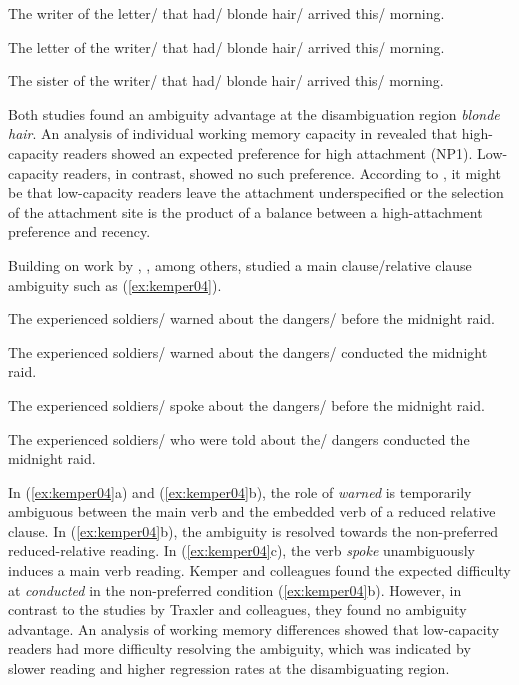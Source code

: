 \documentclass{cambridge7A}\usepackage[]{graphicx}\usepackage[]{color}
\begin{document}
\begin{exe}
\ex\label{ex:traxler07}
\begin{xlist}
\item The writer of the letter/ that had/ blonde hair/ arrived this/ morning.
\item The letter of the writer/ that had/ blonde hair/ arrived this/ morning.
\item The sister of the writer/ that had/ blonde hair/ arrived this/ morning.
\end{xlist}
\end{exe}

Both studies found an ambiguity advantage at the disambiguation region \textit{blonde hair}. An analysis of individual working memory capacity in \cite{Traxler2007} revealed that  high-capacity readers showed an expected preference for high attachment (NP1).  
Low-capacity readers, in contrast, showed no such preference. According to \cite{Traxler2007}, it might be that low-capacity readers leave the attachment underspecified or the selection of the attachment site is the product of a balance between a high-attachment preference and recency.

Building on work by \cite{JustCarpenter1992}, \cite{macdonald1992working}, among others, 
\cite{KemperCrowKemtes2004} studied a main clause/relative clause ambiguity such as (\ref{ex:kemper04}). 

\begin{exe}
\ex\label{ex:kemper04}
\begin{xlist}
\item The experienced soldiers/ warned about the dangers/ before the midnight raid.
\item The experienced soldiers/ warned about the dangers/ conducted the midnight raid.
\item The experienced soldiers/ spoke about the dangers/ before the midnight raid.
\item The experienced soldiers/ who were told about the/ dangers conducted the midnight raid.
\end{xlist}
\end{exe}

In (\ref{ex:kemper04}a) and (\ref{ex:kemper04}b), the role of \textit{warned} is temporarily ambiguous between the main verb and the embedded verb of a reduced relative clause. In (\ref{ex:kemper04}b), the ambiguity is resolved towards the non-preferred reduced-relative reading. In (\ref{ex:kemper04}c), the verb \textit{spoke} unambiguously induces a main verb reading. Kemper and colleagues found the expected difficulty at \textit{conducted} in the non-preferred condition (\ref{ex:kemper04}b). However, in contrast to the studies by Traxler and colleagues, they found no ambiguity advantage. An analysis of working memory differences showed that low-capacity readers had more difficulty resolving the ambiguity, which was indicated by slower reading and higher regression rates at the disambiguating region.
\end{document}
